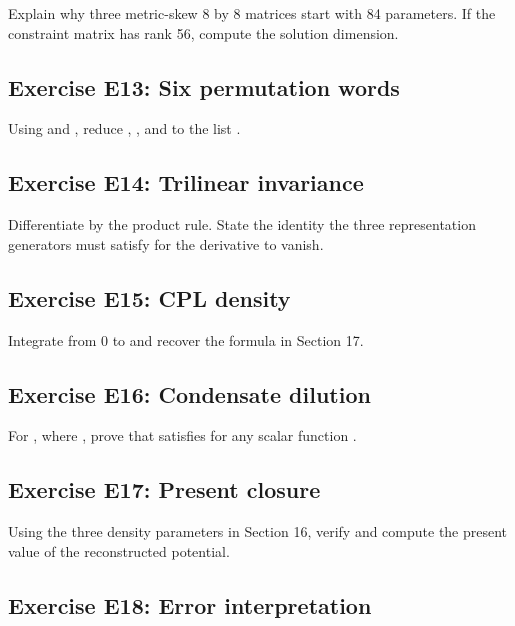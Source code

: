 \documentclass[11pt]{article}
\begin{document}
Explain why three metric-skew 8 by 8 matrices start with 84 parameters. If the constraint matrix has rank 56, compute the solution dimension.

\subsection{Exercise E13: Six permutation words}

Using \texttt{} and \texttt{}, reduce \texttt{}, \texttt{}, and \texttt{} to the list \texttt{}.

\subsection{Exercise E14: Trilinear invariance}

Differentiate \texttt{} by the product rule. State the identity the three representation generators must satisfy for the derivative to vanish.

\subsection{Exercise E15: CPL density}

Integrate \texttt{} from 0 to \texttt{} and recover the formula in Section 17.

\subsection{Exercise E16: Condensate dilution}

For \texttt{}, where \texttt{}, prove that \texttt{} satisfies \texttt{} for any scalar function \texttt{}.

\subsection{Exercise E17: Present closure}

Using the three density parameters in Section 16, verify \texttt{} and compute the present value of the reconstructed potential.

\subsection{Exercise E18: Error interpretation}
\end{document}
